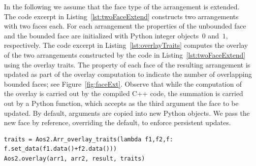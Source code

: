 In the following we assume that the face type of the arrangement
is extended. The code excerpt in Listing~\ref{lst:twoFaceExtend} constructs two arrangements with two faces each. For each arrangement the properties of the unbounded face and the bounded face are initialized with Python integer objects~$0$ and~$1$, respectively.
%
The code excerpt in Listing~\ref{lst:overlayTraits} computes the overlay of the two arrangements constructed by the code in Listing~\ref{lst:twoFaceExtend} using the overlay traits. The property of each face of the resulting arrangement is updated as part of the overlay computation to indicate the number of overlapping bounded faces; see Figure~\ref{fig:faceExt}.
%
Observe that while the computation of the overlay is carried out by the compiled C++ code, the summation is carried out by a Python  function, which accepts as the third argument the face to be updated. By default, arguments are copied into new Python objects. We pass the new face by reference, overriding the default, to enforce persistent updates.

\begin{lstfloat}

\end{lstfloat}

\begin{lstfloat}
\begin{lstlisting}[style=pythonFramedStyle,basicstyle=\scriptsize,label=lst:overlayTraits,caption={Computing the map overlay of two arrangements using the general overlay traits.}]
traits = Aos2.Arr_overlay_traits(lambda f1,f2,f: f.set_data(f1.data()+f2.data()))
Aos2.overlay(arr1, arr2, result, traits)
\end{lstlisting}
\end{lstfloat}

